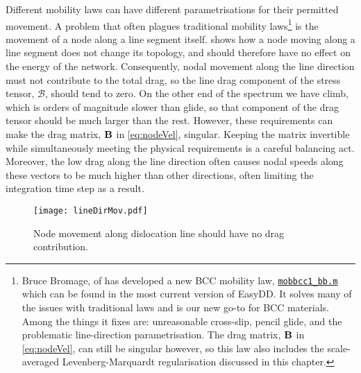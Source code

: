 Different mobility laws can have different parametrisations for their permitted movement. A problem that often plagues traditional mobility laws\footnote{Bruce Bromage, of \cite{bromage2018calculating} has developed a new BCC mobility law, \href{https://github.com/TarletonGroup/EasyDD/blob/master/src/mobbcc_bb1b.m}{\texttt{mobbcc1\_bb.m}} which can be found in the most current version of EasyDD. It solves many of the issues with traditional laws and is our new go-to for BCC materials. Among the things it fixes are: unreasonable cross-slip, pencil glide, and the problematic line-direction parametrisation. The drag matrix, $\mathbf{B}$ in \cref{eq:nodeVel}, can still be singular however, so this law also includes the scale-averaged Levenberg-Marquardt regularisation discussed in this chapter.} is the movement of a node along a line segment itself.  shows how a node moving along a line segment does not change its topology, and should therefore have no effect on the energy of the network. Consequently, nodal movement along the line direction must not contribute to the total drag, so the line drag component of the stress tensor, $\mathcal{B}$, should tend to zero. On the other end of the spectrum we have climb, which is orders of magnitude slower than glide, so that component of the drag tensor should be much larger than the rest. However, these requirements can make the drag matrix, $\mathbf{B}$ in \cref{eq:nodeVel}, singular. Keeping the matrix invertible while simultaneously meeting the physical requirements is a careful balancing act. Moreover, the low drag along the line direction often causes nodal speeds along these vectors to be much higher than other directions, often limiting the integration time step as a result.
\begin{figure}
  \centering
  \texttt{[image: lineDirMov.pdf]}
  \caption{Node movement along dislocation line should have no drag contribution.}
  \label{f:lineMovement}
\end{figure}

